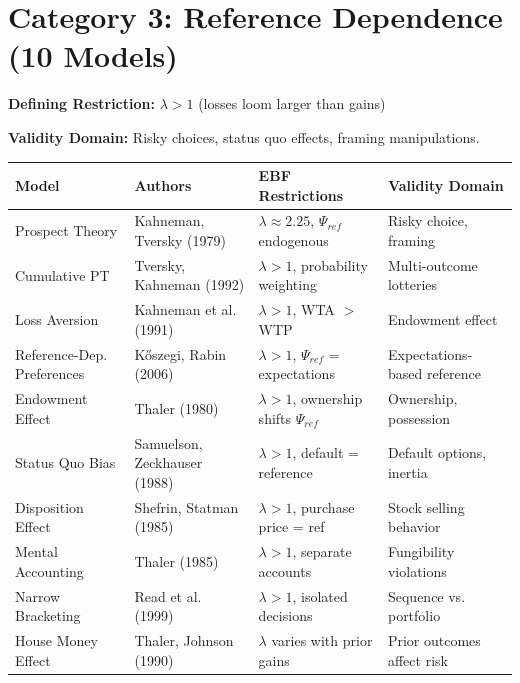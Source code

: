 \section{Category 3: Reference Dependence (10 Models)}
\label{sec:ms-reference}

\begin{tcolorbox}[colback=gray!5!white, colframe=gray!75!black,
    title=\textbf{Reference Dependence: The Loss Aversion Extension}]

\textbf{Defining Restriction:} $\lambda > 1$ (losses loom larger than gains)

\textbf{Validity Domain:} Risky choices, status quo effects,
framing manipulations.

\end{tcolorbox}

\small
\begin{longtable}{@{}p{3cm}p{2.5cm}p{4cm}p{4cm}@{}}
\toprule
\textbf{Model} & \textbf{Authors} & \textbf{EBF Restrictions} & \textbf{Validity Domain} \\
\midrule
\endhead

Prospect Theory & Kahneman, Tversky (1979) &
$\lambda \approx 2.25$, $\Psi_{ref}$ endogenous &
Risky choice, framing \\

Cumulative PT & Tversky, Kahneman (1992) &
$\lambda > 1$, probability weighting &
Multi-outcome lotteries \\

Loss Aversion & Kahneman et al. (1991) &
$\lambda > 1$, WTA $>$ WTP &
Endowment effect \\

Reference-Dep. Preferences & Kőszegi, Rabin (2006) &
$\lambda > 1$, $\Psi_{ref}$ = expectations &
Expectations-based reference \\

Endowment Effect & Thaler (1980) &
$\lambda > 1$, ownership shifts $\Psi_{ref}$ &
Ownership, possession \\

Status Quo Bias & Samuelson, Zeckhauser (1988) &
$\lambda > 1$, default = reference &
Default options, inertia \\

Disposition Effect & Shefrin, Statman (1985) &
$\lambda > 1$, purchase price = ref &
Stock selling behavior \\

Mental Accounting & Thaler (1985) &
$\lambda > 1$, separate accounts &
Fungibility violations \\

Narrow Bracketing & Read et al. (1999) &
$\lambda > 1$, isolated decisions &
Sequence vs. portfolio \\

House Money Effect & Thaler, Johnson (1990) &
$\lambda$ varies with prior gains &
Prior outcomes affect risk \\

\bottomrule
\end{longtable}
\normalsize

